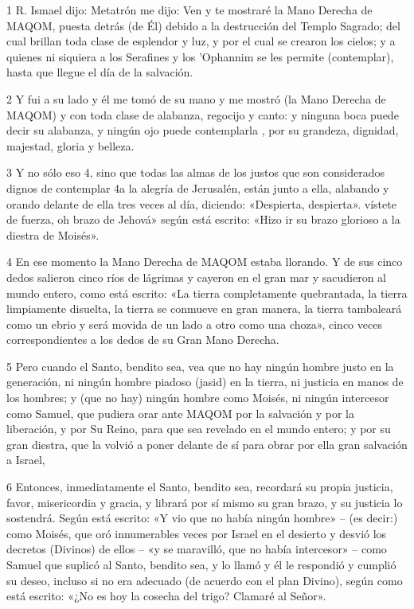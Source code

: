 \par 1 R. Ismael dijo: Metatrón me dijo: Ven y te mostraré la Mano Derecha de MAQOM, puesta detrás (de Él) debido a la destrucción del Templo Sagrado; del cual brillan toda clase de esplendor y luz, y por el cual se crearon los cielos; y a quienes ni siquiera a los Serafines y los 'Ophannim se les permite (contemplar), hasta que llegue el día de la salvación.

\par 2 Y fui a su lado y él me tomó de su mano y me mostró (la Mano Derecha de MAQOM) y con toda clase de alabanza, regocijo y canto: y ninguna boca puede decir su alabanza, y ningún ojo puede contemplarla , por su grandeza, dignidad, majestad, gloria y belleza.

\par 3 Y no sólo eso 4, sino que todas las almas de los justos que son considerados dignos de contemplar 4a la alegría de Jerusalén, están junto a ella, alabando y orando delante de ella tres veces al día, diciendo: «Despierta, despierta». vístete de fuerza, oh brazo de Jehová» según está escrito: «Hizo ir su brazo glorioso a la diestra de Moisés».

\par 4 En ese momento la Mano Derecha de MAQOM estaba llorando. Y de sus cinco dedos salieron cinco ríos de lágrimas y cayeron en el gran mar y sacudieron al mundo entero, como está escrito: «La tierra completamente quebrantada, la tierra limpiamente disuelta, la tierra se conmueve en gran manera, la tierra tambaleará como un ebrio y será movida de un lado a otro como una choza», cinco veces correspondientes a los dedos de su Gran Mano Derecha.

\par 5 Pero cuando el Santo, bendito sea, vea que no hay ningún hombre justo en la generación, ni ningún hombre piadoso (jasid) en la tierra, ni justicia en manos de los hombres; y (que no hay) ningún hombre como Moisés, ni ningún intercesor como Samuel, que pudiera orar ante MAQOM por la salvación y por la liberación, y por Su Reino, para que sea revelado en el mundo entero; y por su gran diestra, que la volvió a poner delante de sí para obrar por ella gran salvación a Israel,

\par 6 Entonces, inmediatamente el Santo, bendito sea, recordará su propia justicia, favor, misericordia y gracia, y librará por sí mismo su gran brazo, y su justicia lo sostendrá. Según está escrito: «Y vio que no había ningún hombre» – (es decir:) como Moisés, que oró innumerables veces por Israel en el desierto y desvió los decretos (Divinos) de ellos – «y se maravilló, que no había intercesor» – como Samuel que suplicó al Santo, bendito sea, y lo llamó y él le respondió y cumplió su deseo, incluso si no era adecuado (de acuerdo con el plan Divino), según como está escrito: «¿No es hoy la cosecha del trigo? Clamaré al Señor».

